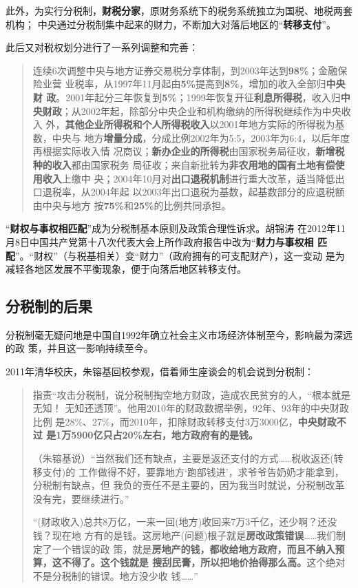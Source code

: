 此外，为实行分税制，\textbf{财税分家}，原财务系统下的税务系统独立为国税、地税两套机构；
中央通过分税制集中起来的财力，不断加大对落后地区的“\textbf{转移支付}”。

此后又对税权划分进行了一系列调整和完善：
\begin{quotation}
  连续6次调整中央与地方证券交易税分享体制，到2003年达到\textbf{98\%}；金融保险业营
  业税率，从1997年11月起由\textbf{5\%}提高到\textbf{8\%}，增加的收入全部归\textbf{中央财
    政}。2001年起分三年恢复到\textbf{5\%}；1999年恢复开征\textbf{利息所得税}，收入归\textbf{中
    央财政}；从2002年起，除部分中央企业和机构缴纳的所得税继续作为中央收入
  外，\textbf{其他企业所得税和个人所得税收入}以2001年地方实际的所得税为基数，中央与
  地方\textbf{增量分成}，分成比例2002年为5:5，2003年为6:4，以后年度再根据实际收入情
  况商议；\textbf{新办企业的所得税}由国家税务局征收，\textbf{新增税种的收入}都由国家税务
  局征收；来自新批转为\textbf{非农用地的国有土地有偿使用收入}上缴中
  央；2004年10月对\textbf{出口退税机制}进行重大改革，适当降低出口退税率，从2004年起
  以2003年出口退税为基数，起基数部分的应退税额由中央与地方
  按\textbf{75\%}和\textbf{25\%}的比例共同承担。\cite{eryuancaizheng}
\end{quotation}

“\textbf{财权与事权相匹配}”成为分税制基本原则及政策合理性诉求。胡锦涛
在2012年11月8日中国共产党第十八次代表大会上所作政府报告中改为“\textbf{财力与事权相
  匹配}”。“财权”（与税基相关）变“财力”（政府拥有的可支配财产），这一变动
是为减轻各地区发展不平衡现象，便于向落后地区转移支付。

\subsection{分税制的后果}

分税制毫无疑问地是中国自1992年确立社会主义市场经济体制至今，影响最为深远的政
策，并且这一影响持续至今。


2011年清华校庆，朱镕基回校参观，借着师生座谈会的机会说到分税制：
\begin{quotation}
  指责“攻击分税制，说分税制掏空地方财政，造成农民贫穷的人，“根本就是无知！
  无知还透顶”。他用2010年的财政数据举例，92年、93年的中央财政比例
  是28\%、27\%，而2010年，扣除财政转移支付3万3000亿，\textbf{中央财政不过
    是1万5900亿只占20\%左右，地方政府有的是钱。}

  （朱镕基说）“当然我们还有缺点，主要是返还支付的方式……税收返还(转移支付)的
  工作做得不好，要靠地方‘跑部钱进’，求爷爷告奶奶才能拿到，分税制有缺点，但
  我负的责任不是主要的，因为我当时就说，分税制改革没有完，要继续进行。”

  “(财政收入)总共8万亿，一来一回(地方)收回来7万3千亿，还少啊？还没钱？现在地
  方有的是钱。这房地产(问题)根子就是\textbf{房改政策错误}……我们制定了一个错误的政
  策，就是\textbf{房地产的钱，都收给地方政府，而且不纳入预算，这不得了。这个钱就是
    搜刮民膏，所以把地价抬得那么高。}这个绝对不是分税制的错误。地方没少收
  钱……”
\end{quotation}

